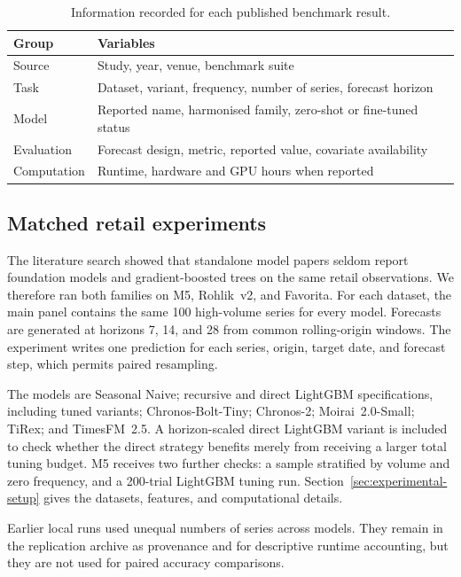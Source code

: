 \begin{table}[htbp]
\centering
\caption{Information recorded for each published benchmark result.}
\label{tab:extraction-schema}
\small
\begin{tabularx}{\textwidth}{l X}
\toprule
Group & Variables \\
\midrule
Source & Study, year, venue, benchmark suite \\
Task & Dataset, variant, frequency, number of series, forecast horizon \\
Model & Reported name, harmonised family, zero-shot or fine-tuned status \\
Evaluation & Forecast design, metric, reported value, covariate availability \\
Computation & Runtime, hardware and GPU hours when reported \\
\bottomrule
\end{tabularx}
\end{table}

\subsection{Matched retail experiments}
\label{subsec:gapfilling}

The literature search showed that standalone model papers seldom report
foundation models and gradient-boosted trees on the same retail observations.
We therefore ran both families on M5, Rohlik~v2, and Favorita. For each
dataset, the main panel contains the same 100 high-volume series for every
model. Forecasts are generated at horizons 7, 14, and 28 from common
rolling-origin windows. The experiment writes one prediction for each series,
origin, target date, and forecast step, which permits paired resampling.

The models are Seasonal Naive; recursive and direct LightGBM specifications,
including tuned variants; Chronos-Bolt-Tiny; Chronos-2;
Moirai~2.0-Small; TiRex; and TimesFM~2.5. A horizon-scaled direct LightGBM
variant is included to check whether the direct strategy benefits merely from
receiving a larger total tuning budget. M5 receives two further checks: a
sample stratified by volume and zero frequency, and a 200-trial LightGBM
tuning run. Section~\ref{sec:experimental-setup} gives the datasets, features,
and computational details.

Earlier local runs used unequal numbers of series across models. They remain
in the replication archive as provenance and for descriptive runtime
accounting, but they are not used for paired accuracy comparisons.


